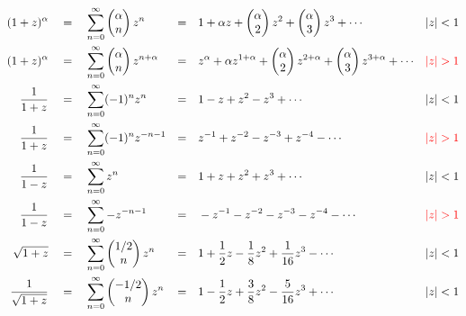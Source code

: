 \documentclass[UTF8]{ctexart}
\begin{document}
\begin{align*}
    (1+z)^{\alpha} \quad&=\quad \sum_{n=0}^{\infty} \begin{pmatrix}\alpha\\n\end{pmatrix}z^n &=&\quad 1+\alpha z+\begin{pmatrix}\alpha\\2\end{pmatrix}z^2+\begin{pmatrix}\alpha\\3\end{pmatrix}z^3+\cdots & |z|<1 \\
    (1+z)^{\alpha} \quad&=\quad \sum_{n=0}^{\infty} \begin{pmatrix}\alpha\\n\end{pmatrix}z^{n+\alpha} &=&\quad z^{\alpha}+\alpha z^{1+\alpha}+\begin{pmatrix}\alpha\\2\end{pmatrix}z^{2+\alpha}+\begin{pmatrix}\alpha\\3\end{pmatrix}z^{3+\alpha}+\cdots & {\color{red}|z|>1} \\
    \frac{1}{1+z} \quad&=\quad \sum_{n=0}^{\infty}(-1)^nz^n &=&\quad 1-z+z^2-z^3+\cdots & |z|<1 \\
    \frac{1}{1+z} \quad&=\quad \sum_{n=0}^{\infty}(-1)^nz^{-n-1} &=&\quad z^{-1}+z^{-2}-z^{-3}+z^{-4}-\cdots & {\color{red}|z|>1} \\
    \frac{1}{1-z} \quad&=\quad \sum_{n=0}^{\infty}z^n &=&\quad 1+z+z^2+z^3+\cdots & |z|<1 \\
    \frac{1}{1-z} \quad&=\quad \sum_{n=0}^{\infty}-z^{-n-1} &=&\quad -z^{-1}-z^{-2}-z^{-3}-z^{-4}-\cdots & {\color{red}|z|>1} \\
    \sqrt{1+z} \quad&=\quad \sum_{n=0}^{\infty}\begin{pmatrix}1/2\\n\end{pmatrix}z^n &=&\quad 1+\frac{1}{2}z-\frac{1}{8}z^2+\frac{1}{16}z^3-\cdots & |z|<1\\
    \frac{1}{\sqrt{1+z}} \quad&=\quad \sum_{n=0}^{\infty}\begin{pmatrix}-1/2\\n\end{pmatrix}z^n &=&\quad 1-\frac{1}{2}z+\frac{3}{8}z^2-\frac{5}{16}z^3+\cdots & |z|<1
\end{align*}
\end{document}
